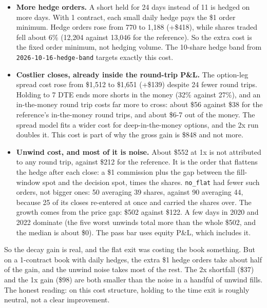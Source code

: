 \documentclass{article}
\begin{document}
\begin{itemize}

\item \textbf{More hedge orders.} A short held for 24 days instead of 11 is hedged on more days. With 1 contract, each small daily hedge pays the \$1 order minimum. Hedge orders rose from 770 to 1,188 (+\$418), while shares traded fell about 6\% (12,204 against 13,046 for the reference). So the extra cost is the fixed order minimum, not hedging volume. The 10-share hedge band from \texttt{2026-\allowbreak{}10-\allowbreak{}16-\allowbreak{}hedge-\allowbreak{}band} targets exactly this cost.

\item \textbf{Costlier closes, already inside the round-trip P\&L.} The option-leg spread cost rose from \$1,512 to \$1,651 (+\$139) despite 24 fewer round trips. Holding to 7 DTE ends more shorts in the money (32\% against 27\%), and an in-the-money round trip costs far more to cross: about \$56 against \$38 for the reference's in-the-money round trips, and about \$6-7 out of the money. The spread model fits a wider cost for deep-in-the-money options, and the 2x run doubles it. This cost is part of why the gross gain is \$848 and not more.

\item \textbf{Unwind cost, and most of it is noise.} About \$552 at 1x is not attributed to any round trip, against \$212 for the reference. It is the order that flattens the hedge after each close: a \$1 commission plus the gap between the fill-window spot and the decision spot, times the shares. \texttt{no\_\allowbreak{}flat} had fewer such orders, not bigger ones: 50 averaging 39 shares, against 90 averaging 44, because 25 of its closes re-entered at once and carried the shares over. The growth comes from the price gap: \$502 against \$122. A few days in 2020 and 2022 dominate (the five worst unwinds total more than the whole \$502, and the median is about \$0). The pass bar uses equity P\&L, which includes it.

\end{itemize}

So the decay gain is real, and the flat exit was costing the book something. But on a 1-contract book with daily hedges, the extra \$1 hedge orders take about half of the gain, and the unwind noise takes most of the rest. The 2x shortfall (\$37) and the 1x gain (\$98) are both smaller than the noise in a handful of unwind fills. The honest reading: on this cost structure, holding to the time exit is roughly neutral, not a clear improvement.
\end{document}
